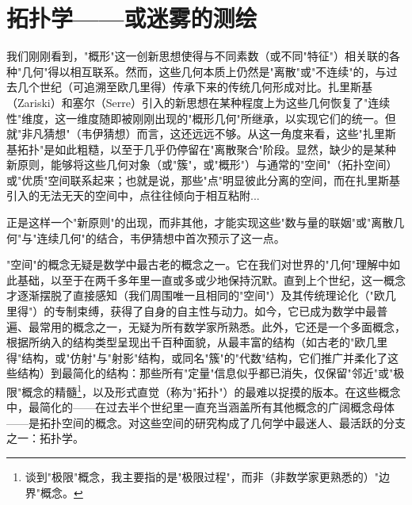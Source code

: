 \section{拓扑学——或迷雾的测绘}

我们刚刚看到，"概形"这一创新思想使得与不同素数（或不同"特征"）相关联的各种"几何"得以相互联系。然而，这些几何本质上仍然是"离散"或"不连续"的，与过去几个世纪（可追溯至欧几里得）传承下来的传统几何形成对比。扎里斯基（Zariski）和塞尔（Serre）引入的新思想在某种程度上为这些几何恢复了"连续性"维度，这一维度随即被刚刚出现的"概形几何"所继承，以实现它们的统一。但就"非凡猜想"（韦伊猜想）而言，这还远远不够。从这一角度来看，这些"扎里斯基拓扑"是如此粗糙，以至于几乎仍停留在"离散聚合"阶段。显然，缺少的是某种新原则，能够将这些几何对象（或"簇"，或"概形"）与通常的"空间"（拓扑空间）或"优质"空间联系起来；也就是说，那些"点"明显彼此分离的空间，而在扎里斯基引入的无法无天的空间中，点往往倾向于相互粘附...

正是这样一个"新原则"的出现，而非其他，才能实现这些"数与量的联姻"或"离散几何"与"连续几何"的结合，韦伊猜想中首次预示了这一点。

"空间"的概念无疑是数学中最古老的概念之一。它在我们对世界的"几何"理解中如此基础，以至于在两千多年里一直或多或少地保持沉默。直到上个世纪，这一概念才逐渐摆脱了直接感知（我们周围唯一且相同的"空间"）及其传统理论化（"欧几里得"）的专制束缚，获得了自身的自主性与动力。如今，它已成为数学中最普遍、最常用的概念之一，无疑为所有数学家所熟悉。此外，它还是一个多面概念，根据所纳入的结构类型呈现出千百种面貌，从最丰富的结构（如古老的"欧几里得"结构，或"仿射"与"射影"结构，或同名"簇"的"代数"结构，它们推广并柔化了这些结构）到最简化的结构：那些所有"定量"信息似乎都已消失，仅保留"邻近"或"极限"概念的精髓\footnote{谈到"极限"概念，我主要指的是"极限过程"，而非（非数学家更熟悉的）"边界"概念。}，以及形式直觉（称为"拓扑"）的最难以捉摸的版本。在这些概念中，最简化的——在过去半个世纪里一直充当涵盖所有其他概念的广阔概念母体——是拓扑空间的概念。对这些空间的研究构成了几何学中最迷人、最活跃的分支之一：拓扑学。

